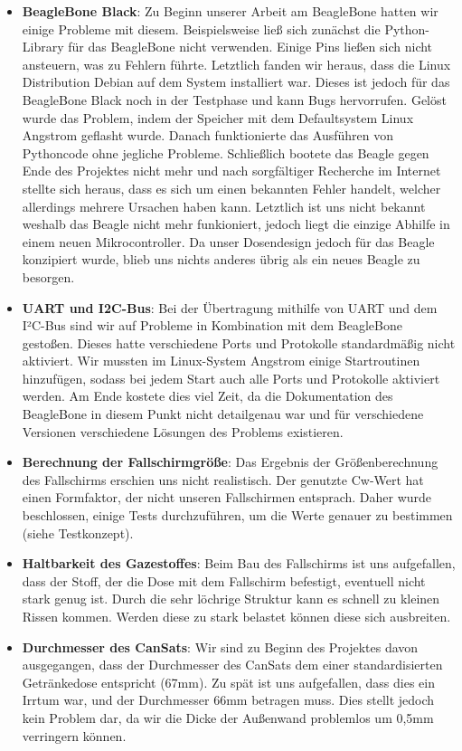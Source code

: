 \begin{itemize}
	\item \textbf{BeagleBone Black}: Zu Beginn unserer Arbeit am BeagleBone hatten wir einige Probleme mit diesem. Beispielsweise ließ sich zunächst die Python-Library für das BeagleBone nicht verwenden. Einige Pins ließen sich nicht ansteuern, was zu Fehlern führte. Letztlich fanden wir heraus, dass die Linux Distribution Debian auf dem System installiert war. Dieses ist jedoch für das BeagleBone Black noch in der Testphase und kann Bugs hervorrufen. Gelöst wurde das Problem, indem der Speicher mit dem Defaultsystem Linux Angstrom geflasht wurde. Danach funktionierte das Ausführen von Pythoncode ohne jegliche Probleme. Schließlich bootete das Beagle gegen Ende des Projektes nicht mehr und nach sorgfältiger Recherche im Internet stellte sich heraus, dass es sich um einen bekannten Fehler handelt, welcher allerdings mehrere Ursachen haben kann. Letztlich ist uns nicht bekannt weshalb das Beagle nicht mehr funkioniert, jedoch liegt die einzige Abhilfe in einem neuen Mikrocontroller. Da unser Dosendesign jedoch für das Beagle konzipiert wurde, blieb uns nichts anderes übrig als ein neues Beagle zu besorgen.
	\item \textbf{UART und I2C-Bus}: Bei der Übertragung mithilfe von UART und dem I²C-Bus sind wir auf Probleme in Kombination mit dem BeagleBone gestoßen. Dieses hatte verschiedene Ports und Protokolle standardmäßig nicht aktiviert. Wir mussten im Linux-System Angstrom einige Startroutinen hinzufügen, sodass bei jedem Start auch alle Ports und Protokolle aktiviert werden. Am Ende kostete dies viel Zeit, da die Dokumentation des BeagleBone in diesem Punkt nicht detailgenau war und für verschiedene Versionen verschiedene Lösungen des Problems existieren.
\item \textbf{Berechnung der Fallschirmgröße}: Das Ergebnis der Größenberechnung des Fallschirms erschien uns nicht realistisch. Der genutzte Cw-Wert hat einen Formfaktor, der nicht unseren Fallschirmen entsprach. Daher wurde beschlossen, einige Tests durchzuführen, um die Werte genauer zu bestimmen (siehe Testkonzept).
\item \textbf{Haltbarkeit des Gazestoffes}: Beim Bau des Fallschirms ist uns aufgefallen, dass der Stoff, der die Dose mit dem Fallschirm befestigt, eventuell nicht stark genug ist. Durch die sehr löchrige Struktur kann es schnell zu kleinen Rissen kommen. Werden diese zu stark belastet können diese sich ausbreiten.
\item \textbf{Durchmesser des CanSats}: Wir sind zu Beginn des Projektes davon ausgegangen, dass der Durchmesser des CanSats dem einer standardisierten Getränkedose entspricht (67mm). Zu spät ist uns aufgefallen, dass dies ein Irrtum war, und der Durchmesser 66mm betragen muss. Dies stellt jedoch kein Problem dar, da wir die Dicke der Außenwand problemlos um 0,5mm verringern können.

\end{itemize}
